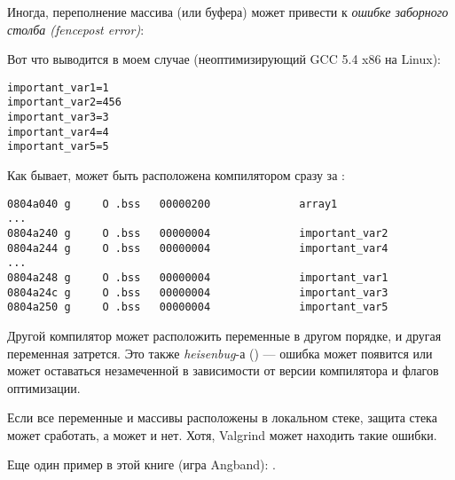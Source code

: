 \label{GlobalArraysOverflowHeisenbug}

Иногда, переполнение массива (или буфера) может привести к \emph{ошибке заборного столба (fencepost error)}:



Вот что выводится в моем случае (неоптимизирующий GCC 5.4 x86 на Linux):

\begin{lstlisting}
important_var1=1
important_var2=456
important_var3=3
important_var4=4
important_var5=5
\end{lstlisting}

Как бывает,  может быть расположена компилятором сразу за :

\begin{lstlisting}[caption=objdump -x]
0804a040 g     O .bss   00000200              array1
...
0804a240 g     O .bss   00000004              important_var2
0804a244 g     O .bss   00000004              important_var4
...
0804a248 g     O .bss   00000004              important_var1
0804a24c g     O .bss   00000004              important_var3
0804a250 g     O .bss   00000004              important_var5
\end{lstlisting}

Другой компилятор может расположить переменные в другом порядке, и другая переменная затрется.
Это также \emph{heisenbug}-а () --- ошибка может появится или может оставаться незамеченной в зависимости
от версии компилятора и флагов оптимизации.

Если все переменные и массивы расположены в локальном стеке, защита стека может сработать, а может и нет.
Хотя, Valgrind может находить такие ошибки.

Еще один пример в этой книге (игра Angband): .

